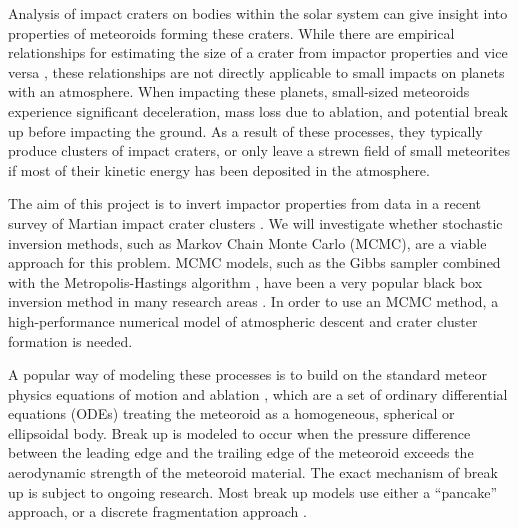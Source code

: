 Analysis of impact craters on bodies within the solar system can give insight into properties of meteoroids forming these craters.
While there are empirical relationships for estimating the size of a crater from impactor properties and vice versa \citep[e.g.][]{holsapple1987scaling}, these relationships are not directly applicable to small impacts on planets with an atmosphere.
When impacting these planets, small-sized meteoroids experience significant deceleration, mass loss due to ablation, and potential break up before impacting the ground.
As a result of these processes, they typically produce clusters of impact craters, or only leave a strewn field of small meteorites if most of their kinetic energy has been deposited in the atmosphere.

The aim of this project is to invert impactor properties from data in a recent survey of Martian impact crater clusters \citep{daubar2019recently}.
We will investigate whether stochastic inversion methods, such as Markov Chain Monte Carlo (MCMC), are a viable approach for this problem.
MCMC models, such as the Gibbs sampler combined with the Metropolis-Hastings algorithm \citep{gelfand1990sampling}, have been a very popular black box inversion method in many research areas \citep[e.g., in epidemiology][]{flaxman2020estimating}.
In order to use an MCMC method, a high-performance numerical model of atmospheric descent and crater cluster formation is needed.

A popular way of modeling these processes is to build on the standard meteor physics equations of motion and ablation \citep[e.g.][]{opik1958physics}, which are a set of ordinary differential equations (ODEs) treating the meteoroid as a homogeneous, spherical or ellipsoidal body.
Break up is modeled to occur when the pressure difference between the leading edge and the trailing edge of the meteoroid exceeds the aerodynamic strength of the meteoroid material.
The exact mechanism of break up is subject to ongoing research. Most break up models use either a ``pancake'' approach, or a discrete fragmentation approach \citep{register2017asteroid}.

